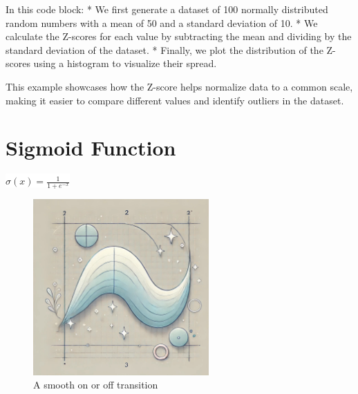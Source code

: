 \documentclass[
  12 pt,
  a4paper,
]{book}
\numberwithin{equation}{section}
\theoremstyle{plain}      %
\theoremstyle{definition} %
\theoremstyle{remark}     %
\theoremstyle{note}         %
\begin{document}
\normalsize

In this code block: * We first generate a dataset of 100 normally
distributed random numbers with a mean of 50 and a standard deviation of
10. * We calculate the Z-scores for each value by subtracting the mean
and dividing by the standard deviation of the dataset. * Finally, we
plot the distribution of the Z-scores using a histogram to visualize
their spread.

This example showcases how the Z-score helps normalize data to a common
scale, making it easier to compare different values and identify
outliers in the dataset.

\newpage

\hypertarget{sigmoid-function}{%
\chapter{Sigmoid Function}\label{sigmoid-function}}

\begin{center}
\colorbox{white}{\color{navyimpactblue} \huge $\sigma(x) = \frac{1}{1 + e^{-x}}$}
\end{center}

\hfill\break

\begin{figure}[h!]
  \begin{center}
    \includegraphics[width=0.6\textwidth]{pictures/Whimsical-4-Sigmoid.jpeg}
    \caption*{\Large A smooth on or off transition}
  \end{center}
\end{figure}

\newpage
\end{document}

